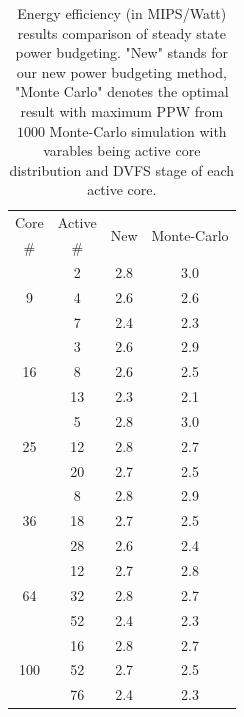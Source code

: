 \begin{table}
  \caption{Energy efficiency (in MIPS/Watt) results comparison of steady state power budgeting. "New" stands for our new power budgeting method, "Monte Carlo" denotes the optimal result with maximum PPW from $1000$ Monte-Carlo simulation with varables being active core distribution and DVFS stage of each active core.}
  \label{tab:PPW_steady}
  \centering
  \begin{tabular}{c|c||c|c}
    \hline
    Core & Active     & \multirow {2}{*}{New} &
                                                    \multirow {2}{*}{Monte-Carlo }\\

\#       &   \#       & &   \\
     \hline
\hline
  \multirow{3}{*}{9} &      2     &       2.8       & 3.0   \\ 
             &      4             &      2.6     &  2.6  \\
             &      7             &       2.4     &  2.3  \\
     \hline
\multirow{3}{*}{16}   &      3    &      2.6     &   2.9 \\   
             &      8             &      2.6    &   2.5  \\
             &      13            &      2.3     &   2.1\\
     \hline
 \multirow{3}{*}{25}  &      5    &     2.8    &   3.0     \\ 
                &     12          &     2.8   &   2.7    \\
                &     20          &     2.7    &   2.5    \\
     \hline
  \multirow{3}{*}{36}  &     8            &      2.8    &  2.9     \\
              &     18            &     2.7          &  2.5   \\
              &     28          &        2.6         &  2.4  \\
     \hline
 \multirow{3}{*}{64}   &     12           &     2.7  &   2.8    \\
              &     32      &      2.8           &   2.7    \\
              &     52        &      2.4          &   2.3     \\
              
 \hline 
 \multirow{3}{*}{100} & 16 & 2.8  &   2.7   \\
                      & 52 & 2.7  &   2.5  \\
                      & 76 & 2.4  &  2.3   \\
\hline
  
\end{tabular}
\end{table}



